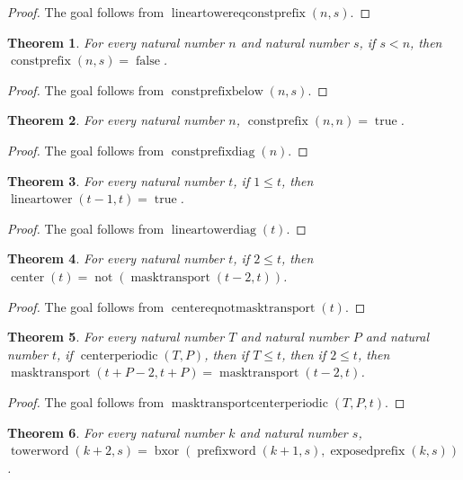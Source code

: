 \documentclass[11pt]{article}
\newtheorem{theorem}{Theorem}[section]
\theoremstyle{definition}
\begin{document}
\begin{proof}
The goal follows from \(\operatorname{lineartowereqconstprefix}(n, s)\).
\end{proof}
\begin{theorem}
\label{ll:observations:const-prefix-below}
For every natural number \(n\) and natural number \(s\), if \(s < n\), then \(\operatorname{constprefix}(n, s) = \operatorname{false}\).
\end{theorem}
\begin{proof}
The goal follows from \(\operatorname{constprefixbelow}(n, s)\).
\end{proof}
\begin{theorem}
\label{ll:observations:const-prefix-diag}
For every natural number \(n\), \(\operatorname{constprefix}(n, n) = \operatorname{true}\).
\end{theorem}
\begin{proof}
The goal follows from \(\operatorname{constprefixdiag}(n)\).
\end{proof}
\begin{theorem}
\label{ll:observations:linear-tower-diag}
For every natural number \(t\), if \(1 \le t\), then \(\operatorname{lineartower}(t - 1, t) = \operatorname{true}\).
\end{theorem}
\begin{proof}
The goal follows from \(\operatorname{lineartowerdiag}(t)\).
\end{proof}
\begin{theorem}
\label{ll:observations:center-eq-not-mask-transport}
For every natural number \(t\), if \(2 \le t\), then \(\operatorname{center}(t) = \operatorname{not}(\operatorname{masktransport}(t - 2, t))\).
\end{theorem}
\begin{proof}
The goal follows from \(\operatorname{centereqnotmasktransport}(t)\).
\end{proof}
\begin{theorem}
\label{ll:observations:mask-transport-center-periodic}
For every natural number \(T\) and natural number \(P\) and natural number \(t\), if \(\operatorname{centerperiodic}(T, P)\), then if \(T \le t\), then if \(2 \le t\), then \(\operatorname{masktransport}(t + P - 2, t + P) = \operatorname{masktransport}(t - 2, t)\).
\end{theorem}
\begin{proof}
The goal follows from \(\operatorname{masktransportcenterperiodic}(T, P, t)\).
\end{proof}
\begin{theorem}
\label{ll:observations:tower-word-split}
For every natural number \(k\) and natural number \(s\), \(\operatorname{towerword}(k + 2, s) = \operatorname{bxor}(\operatorname{prefixword}(k + 1, s), \operatorname{exposedprefix}(k, s))\).
\end{theorem}
\end{document}

